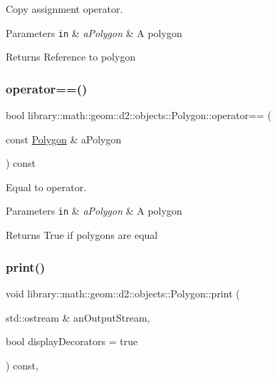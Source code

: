Copy assignment operator. 


\begin{DoxyParams}[1]{Parameters}
\mbox{\tt in}  & {\em a\+Polygon} & A polygon \\
\hline
\end{DoxyParams}
\begin{DoxyReturn}{Returns}
Reference to polygon 
\end{DoxyReturn}
\mbox{\label{classlibrary_1_1math_1_1geom_1_1d2_1_1objects_1_1_polygon_a2d92051aa3535659ec1ca1849ea65fa0}} 
\subsubsection{\texorpdfstring{operator==()}{operator==()}}
{\footnotesize\ttfamily bool library\+::math\+::geom\+::d2\+::objects\+::\+Polygon\+::operator== (\begin{DoxyParamCaption}\item[{const \hyperlink{classlibrary_1_1math_1_1geom_1_1d2_1_1objects_1_1_polygon}{Polygon} \&}]{a\+Polygon }\end{DoxyParamCaption}) const}



Equal to operator. 


\begin{DoxyParams}[1]{Parameters}
\mbox{\tt in}  & {\em a\+Polygon} & A polygon \\
\hline
\end{DoxyParams}
\begin{DoxyReturn}{Returns}
True if polygons are equal 
\end{DoxyReturn}
\mbox{\label{classlibrary_1_1math_1_1geom_1_1d2_1_1objects_1_1_polygon_a028ca7818387654ed1aab1584cee6cc5}} 
\subsubsection{\texorpdfstring{print()}{print()}}
{\footnotesize\ttfamily void library\+::math\+::geom\+::d2\+::objects\+::\+Polygon\+::print (\begin{DoxyParamCaption}\item[{std\+::ostream \&}]{an\+Output\+Stream,  }\item[{bool}]{display\+Decorators = {\ttfamily true} }\end{DoxyParamCaption}) const\hspace{0.3cm}{\ttfamily [override]}, {\ttfamily [virtual]}}



